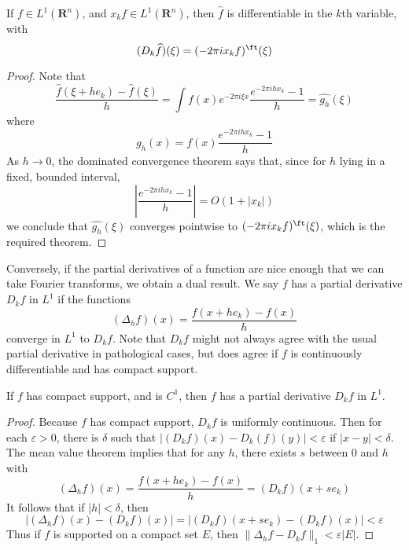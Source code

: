 \begin{theorem}
	If $f \in L^1(\mathbf{R}^n)$, and $x_k f \in L^1(\mathbf{R}^n)$, then $\widehat{f}$ is differentiable in the $k$th variable, with
	\[ (D_k \widehat{f})(\xi) = (- 2 \pi i x_k f)^\ft(\xi) \]
\end{theorem}
\begin{proof}
	Note that
	\[ \frac{\widehat{f}(\xi + h e_k) - \widehat{f}(\xi)}{h} = \int f(x) e^{- 2 \pi i \xi x} \frac{e^{-2 \pi i h x_k} - 1}{h} = \widehat{g_h}(\xi) \]
	where
	\[ g_h(x) = f(x) \frac{e^{- 2 \pi i h x_k} - 1}{h} \]
	As $h \to 0$, the dominated convergence theorem says that, since for $h$ lying in a fixed, bounded interval,
	\[ \left| \frac{e^{-2 \pi i h x_k} - 1}{h} \right| = O(1 + |x_k|) \]
	we conclude that $\widehat{g_h}(\xi)$ converges pointwise to $(-2 \pi i x_k f)^\ft(\xi)$, which is the required theorem.
\end{proof}

Conversely, if the partial derivatives of a function are nice enough that we can take Fourier transforms, we obtain a dual result. We say $f$ has a partial derivative $D_k f$ in $L^1$ if the functions
%
\[ (\Delta_h f)(x) = \frac{f(x + h e_k) - f(x)}{h} \]
%
converge in $L^1$ to $D_k f$. Note that $D_k f$ might not always agree with the usual partial derivative in pathological cases, but does agree if $f$ is continuously differentiable and has compact support.

\begin{theorem}
	If $f$ has compact support, and is $C^1$, then $f$ has a partial derivative $D_k f$ in $L^1$.
\end{theorem}
\begin{proof}
	Because $f$ has compact support, $D_k f$ is uniformly continuous. Then for each $\varepsilon > 0$, there is $\delta$ such that $|(D_k f)(x) - D_k(f)(y)| < \varepsilon$ if $|x - y| < \delta$. The mean value theorem implies that for any $h$, there exists $s$ between $0$ and $h$ with
	\[ (\Delta_h f)(x) = \frac{f(x + he_k) - f(x)}{h} = (D_k f)(x + se_k) \]
	It follows that if $|h| < \delta$, then
	\[ |(\Delta_h f)(x) - (D_k f)(x)| = |(D_k f)(x + se_k) - (D_k f)(x)| < \varepsilon \]
	Thus if $f$ is supported on a compact set $E$, then $\| \Delta_h f - D_k f \|_1 < \varepsilon |E|$.
\end{proof}

